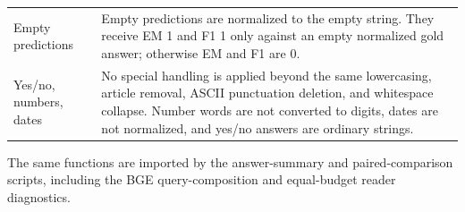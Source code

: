 \documentclass[pdflatex,sn-basic,Numbered]{sn-jnl}
\begin{document}
\begin{table}[t]
\begin{threeparttable}
\begin{tabularx}{\textwidth}{>{\raggedright\arraybackslash}p{}
                            >{\raggedright\arraybackslash}X}
Empty predictions & Empty predictions are normalized to the empty string. They receive EM 1 and F1 1 only against an empty normalized gold answer; otherwise EM and F1 are 0. \\
Yes/no, numbers, dates & No special handling is applied beyond the same lowercasing, article removal, ASCII punctuation deletion, and whitespace collapse. Number words are not converted to digits, dates are not normalized, and yes/no answers are ordinary strings. \\
\bottomrule
\end{tabularx}
\begin{tablenotes}
\footnotesize
\item The same functions are imported by the answer-summary and paired-comparison scripts, including the BGE query-composition and equal-budget reader diagnostics.
\end{tablenotes}
\end{threeparttable}
\end{table}
\end{document}
